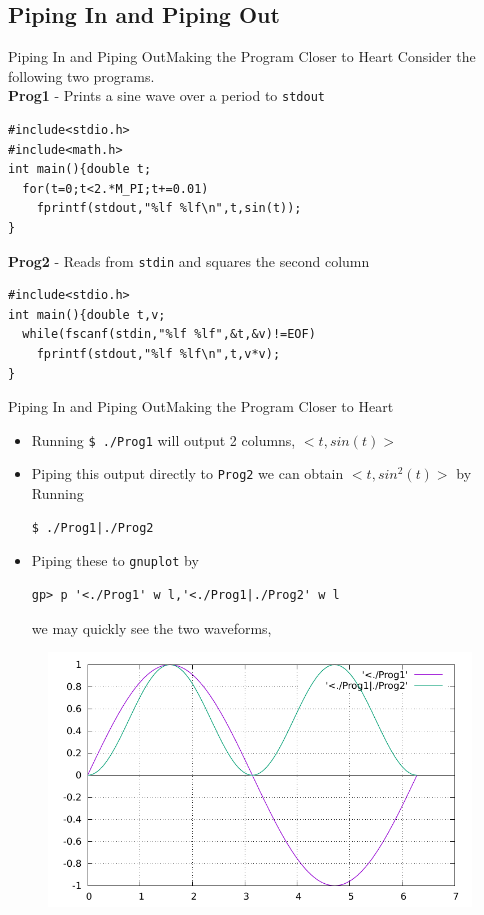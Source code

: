 \documentclass{beamer}
\begin{document}
\subsection{Piping In and Piping Out}
\begin{frame}[fragile]{Piping In and Piping Out}{Making the Program Closer to Heart}
Consider the following two programs.\\
\textbf{Prog1} - Prints a sine wave over a period to \verb|stdout|
\begin{verbatim}
#include<stdio.h>
#include<math.h>
int main(){double t;
  for(t=0;t<2.*M_PI;t+=0.01)
    fprintf(stdout,"%lf %lf\n",t,sin(t));
}
\end{verbatim}
\textbf{Prog2} - Reads from \verb|stdin| and squares the second column
\begin{verbatim}
#include<stdio.h>
int main(){double t,v;
  while(fscanf(stdin,"%lf %lf",&t,&v)!=EOF)
    fprintf(stdout,"%lf %lf\n",t,v*v);
}
\end{verbatim}
\end{frame}

\begin{frame}[fragile]{Piping In and Piping Out}{Making the Program Closer to Heart}
\begin{itemize}
\item Running \verb|$ ./Prog1| will output 2 columns, $<t,sin(t)>$
\item Piping this output directly to \verb|Prog2| we can obtain $<t,sin^2(t)>$ by Running 
\begin{verbatim}
$ ./Prog1|./Prog2
\end{verbatim}
\item Piping these to \verb|gnuplot| by
\begin{verbatim}
gp> p '<./Prog1' w l,'<./Prog1|./Prog2' w l
\end{verbatim} 
we may quickly see the two waveforms,
\end{itemize}
\begin{figure}
\centering
\includegraphics[scale=0.5]{iopipes.pdf}
\end{figure}
\end{frame}
\end{document}

